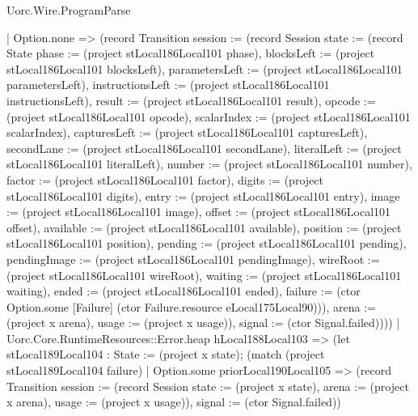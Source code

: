 \begin{lexlean}{Uorc.Wire.ProgramParse}
\begin{semanticmodule}
{        | Option.none => (record Transition {session := (record Session {state := (record State {phase := (project stLocal186Local101 phase), blocksLeft := (project stLocal186Local101 blocksLeft), parametersLeft := (project stLocal186Local101 parametersLeft), instructionsLeft := (project stLocal186Local101 instructionsLeft), result := (project stLocal186Local101 result), opcode := (project stLocal186Local101 opcode), scalarIndex := (project stLocal186Local101 scalarIndex), capturesLeft := (project stLocal186Local101 capturesLeft), secondLane := (project stLocal186Local101 secondLane), literalLeft := (project stLocal186Local101 literalLeft), number := (project stLocal186Local101 number), factor := (project stLocal186Local101 factor), digits := (project stLocal186Local101 digits), entry := (project stLocal186Local101 entry), image := (project stLocal186Local101 image), offset := (project stLocal186Local101 offset), available := (project stLocal186Local101 available), position := (project stLocal186Local101 position), pending := (project stLocal186Local101 pending), pendingImage := (project stLocal186Local101 pendingImage), wireRoot := (project stLocal186Local101 wireRoot), waiting := (project stLocal186Local101 waiting), ended := (project stLocal186Local101 ended), failure := (ctor Option.some [Failure] (ctor Failure.resource eLocal175Local90))}), arena := (project x arena), usage := (project x usage)}), signal := (ctor Signal.failed)})))
      | Uorc.Core.RuntimeResources::Error.heap hLocal188Local103 => (let stLocal189Local104 : State := (project x state); (match (project stLocal189Local104 failure)
        | Option.some priorLocal190Local105 => (record Transition {session := (record Session {state := (project x state), arena := (project x arena), usage := (project x usage)}), signal := (ctor Signal.failed)})
}
\end{semanticmodule}
\end{lexlean}
